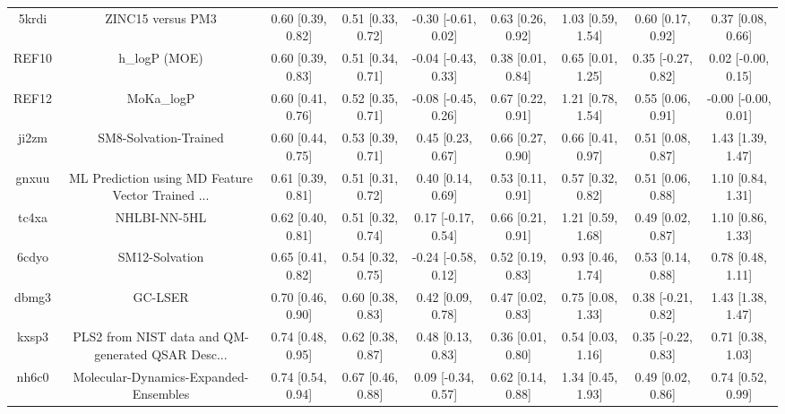 \documentclass{article}
\begin{document}
\begin{center}
\begin{longtable}{|ccccccccc|}
 5krdi &                                  ZINC15 versus PM3 &  0.60 [0.39, 0.82] &  0.51 [0.33, 0.72] &   -0.30 [-0.61, 0.02] &  0.63 [0.26, 0.92] &    1.03 [0.59, 1.54] &    0.60 [0.17, 0.92] &     0.37 [0.08, 0.66] \\
 REF10 &                                      h\_logP (MOE) &  0.60 [0.39, 0.83] &  0.51 [0.34, 0.71] &   -0.04 [-0.43, 0.33] &  0.38 [0.01, 0.84] &    0.65 [0.01, 1.25] &   0.35 [-0.27, 0.82] &    0.02 [-0.00, 0.15] \\
 REF12 &                                         MoKa\_logP &  0.60 [0.41, 0.76] &  0.52 [0.35, 0.71] &   -0.08 [-0.45, 0.26] &  0.67 [0.22, 0.91] &    1.21 [0.78, 1.54] &    0.55 [0.06, 0.91] &   -0.00 [-0.00, 0.01] \\
 ji2zm &                              SM8-Solvation-Trained &  0.60 [0.44, 0.75] &  0.53 [0.39, 0.71] &     0.45 [0.23, 0.67] &  0.66 [0.27, 0.90] &    0.66 [0.41, 0.97] &    0.51 [0.08, 0.87] &     1.43 [1.39, 1.47] \\
 gnxuu &  ML Prediction using MD Feature Vector Trained ... &  0.61 [0.39, 0.81] &  0.51 [0.31, 0.72] &     0.40 [0.14, 0.69] &  0.53 [0.11, 0.91] &    0.57 [0.32, 0.82] &    0.51 [0.06, 0.88] &     1.10 [0.84, 1.31] \\
 tc4xa &                                       NHLBI-NN-5HL &  0.62 [0.40, 0.81] &  0.51 [0.32, 0.74] &    0.17 [-0.17, 0.54] &  0.66 [0.21, 0.91] &    1.21 [0.59, 1.68] &    0.49 [0.02, 0.87] &     1.10 [0.86, 1.33] \\
 6cdyo &                                     SM12-Solvation &  0.65 [0.41, 0.82] &  0.54 [0.32, 0.75] &   -0.24 [-0.58, 0.12] &  0.52 [0.19, 0.83] &    0.93 [0.46, 1.74] &    0.53 [0.14, 0.88] &     0.78 [0.48, 1.11] \\
 dbmg3 &                                            GC-LSER &  0.70 [0.46, 0.90] &  0.60 [0.38, 0.83] &     0.42 [0.09, 0.78] &  0.47 [0.02, 0.83] &    0.75 [0.08, 1.33] &   0.38 [-0.21, 0.82] &     1.43 [1.38, 1.47] \\
 kxsp3 &  PLS2 from NIST data and QM-generated QSAR Desc... &  0.74 [0.48, 0.95] &  0.62 [0.38, 0.87] &     0.48 [0.13, 0.83] &  0.36 [0.01, 0.80] &    0.54 [0.03, 1.16] &   0.35 [-0.22, 0.83] &     0.71 [0.38, 1.03] \\
 nh6c0 &              Molecular-Dynamics-Expanded-Ensembles &  0.74 [0.54, 0.94] &  0.67 [0.46, 0.88] &    0.09 [-0.34, 0.57] &  0.62 [0.14, 0.88] &    1.34 [0.45, 1.93] &    0.49 [0.02, 0.86] &     0.74 [0.52, 0.99] \\

\end{longtable}
\end{center}
\end{document}
